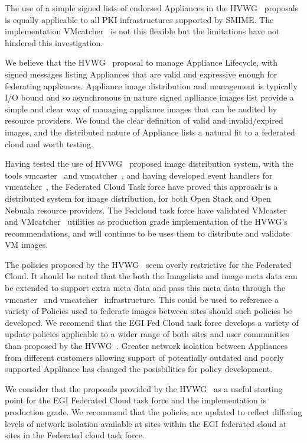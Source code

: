 \documentclass{llncs_Ibergrid2013}
\begin{document}
The use of a simple signed lists of endorsed Appliances in the HVWG~\cite{hepix} proposals is equally applicable to all PKI infrastructures supported by SMIME. The implementation VMcatcher~\cite{vmcatcher} is not this flexible but the limitations have not hindered this investigation.

We believe that the HVWG~\cite{hepix} proposal to manage Appliance Lifecycle, with signed messages listing Appliances that are valid and expressive enough for federating appliances. Appliance image distribution and management is typically I/O bound and so asynchronous in nature signed aplliance images list provide a simple and clear way of managing appliance images that can be audited by resource providers. We found the clear definition of valid and invalid/expired images, and the distributed nature of Appliance lists a natural fit to a federated cloud and worth testing.

Having tested the use of HVWG~\cite{hepix} proposed image distribution system, with the tools vmcaster~\cite{vmcaster} and vmcatcher~\cite{vmcatcher}, and having developed event handlers for vmcatcher~\cite{vmcatcher}, the Federated Cloud Task force have proved this approach is a distributed system for image distribution, for both Open Stack and Open Nebuala resource providers. The Fedcloud task force have validated VMcaster~\cite{vmcaster} and VMcatcher~\cite{vmcatcher} utilities as production grade implementation of the HVWG's~\cite{hepix} recommendations, and will continue to be uses them to distribute and validate VM images.

The policies proposed by the HVWG~\cite{hepix} seem overly restrictive for the Federated Cloud. It should be noted that the both the Imagelists and image meta data can be extended to support extra meta data and pass this meta data through the vmcaster~\cite{vmcaster} and vmcatcher~\cite{vmcatcher} infrastructure. This could be used to reference a variety of Policies used to federate images between sites should such policies be developed. We recomend that the EGI Fed Cloud task force develops a variety of update policies applicable to a wider range of both sites and user communities than proposed by the HVWG~\cite{hepix}. Greater network isolation between Appliances from different customers allowing support of potentially outdated and poorly supported Appliance has changed the posisbilities for policy development.

We consider that the proposals provided by the HVWG~\cite{hepix} as a useful starting point for the EGI Federated Cloud task force and the implementation is production grade. We recommend that the policies are updated to reflect differing levels of network isolation available at sites within the EGI federated cloud at sites in the Federated cloud task force.
\end{document}
